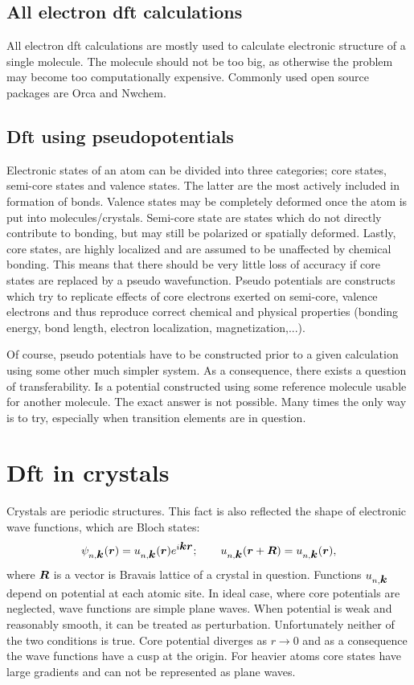 \documentclass[openany, longbibliography,slovene,a4paper,12pt]{article}
\def\vec#1{\mbox{\boldmath$#1$}}
\begin{document}
\subsection{All electron dft calculations}
All electron dft calculations are mostly used to calculate electronic structure of
a single molecule. The molecule should not be too big, as otherwise the problem
may become too computationally expensive. Commonly used open source packages
are Orca and Nwchem.

\subsection{Dft using pseudopotentials}
Electronic states of an atom can be divided into three categories; core states,
semi-core states and valence states. The latter are the most actively included
in formation of bonds. Valence states may be completely deformed once the atom
is put into molecules/crystals. Semi-core state are states which do not
directly contribute to bonding, but may still be polarized or spatially
deformed. Lastly, core states, are highly localized and are assumed to be
unaffected by chemical bonding. This means that there should be very little loss
of accuracy if core states are replaced by a pseudo wavefunction.
Pseudo potentials are constructs which try to
replicate effects of core electrons exerted on semi-core, valence electrons and
thus reproduce correct chemical and physical properties (bonding energy, bond
length, electron localization, magnetization,...).

Of course, pseudo potentials have to be constructed prior to a given calculation using
some other much simpler system. As a consequence, there
exists a question of transferability. Is a potential constructed using some
reference molecule usable for another molecule. The exact answer is
not possible. Many times the only way is to try, especially when transition
elements are in question.


\section{Dft in crystals}
Crystals are periodic structures. This fact is also reflected the shape of
electronic  wave functions, which are Bloch states:
\begin{equation}
  \psi_{n, \vec k}(\vec r) = u_{n, \vec k}(\vec r)e^{i\vec k \vec r};\quad \textrm\quad u_{n,\vec k}(\vec r + \vec R) =  u_{n,\vec k}(\vec r),
\end{equation}
where $\vec R$ is a vector is Bravais lattice of a crystal in question.
Functions $u_{n,\vec k}$ depend on potential at each atomic site.
In ideal case, where core potentials are neglected,
wave functions are simple plane waves. When potential is weak and
reasonably smooth, it can be treated as perturbation. Unfortunately neither of
the two conditions is true. Core potential diverges as $r \rightarrow 0$
and as a consequence the wave functions have a cusp at the origin. For heavier
atoms core states have large gradients and can not be represented as plane waves.
\end{document}
